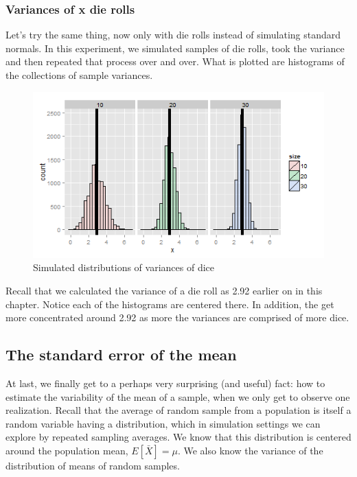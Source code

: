 \documentclass[]{article}
\begin{document}
\subsubsection{Variances of x die rolls}\label{variances-of-x-die-rolls}

Let's try the same thing, now only with die rolls instead of simulating
standard normals. In this experiment, we simulated samples of die rolls,
took the variance and then repeated that process over and over. What is
plotted are histograms of the collections of sample variances.

\begin{figure}[htbp]
\centering
\includegraphics{LeanPub/images/dieVariances-1.png}
\caption{Simulated distributions of variances of dice}
\end{figure}

Recall that we calculated the variance of a die roll as 2.92 earlier on
in this chapter. Notice each of the histograms are centered there. In
addition, the get more concentrated around 2.92 as more the variances
are comprised of more dice.

\subsection{The standard error of the
mean}\label{the-standard-error-of-the-mean}

At last, we finally get to a perhaps very surprising (and useful) fact:
how to estimate the variability of the mean of a sample, when we only
get to observe one realization. Recall that the average of random sample
from a population is itself a random variable having a distribution,
which in simulation settings we can explore by repeated sampling
averages. We know that this distribution is centered around the
population mean, $E[\bar X] = \mu$. We also know the variance of the
distribution of means of random samples.
\end{document}
